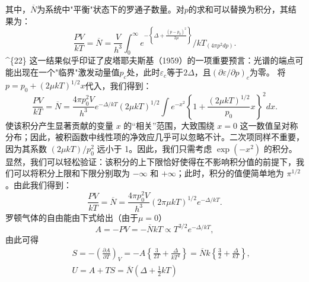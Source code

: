 其中，\(\overline{N}\)为系统中"平衡"状态下的罗通子数量。对\(p\)的求和可以替换为积分，其结果为：
\begin{equation}\tag{7.5.27}\label{eq:7.5.27}
\frac { P V } { k T } = \overline { { N } } = \frac { V } { h ^{3} } \int _ { 0 } ^{\infty} e ^{- \left\{ \Delta + \frac { ( p - p _ { 0} ) ^{2} } { 2 \mu } \right\} } \Bigg / k T _ { ( 4 \pi p ^{2} d p ) } .
\end{equation}
\^{}\{22\} 这一结果似乎印证了皮塔耶夫斯基（1959）的一项重要预言：光谱的端点可能出现在一个"临界"激发动量值\(p_{c}\)处，此时\(\varepsilon_{c}\)等于\(2\Delta\)，且\((\partial\varepsilon/\partial p)_{c}\)为零。
将\(p = p_0 + (2\mu kT)^{1/2}x\)代入，我们得到：
\begin{equation}\tag{7.5.28}\label{eq:7.5.28}
\frac { P V } { k T } = \overline { { { N } } } = \frac { 4 \pi p _ { 0 } ^{2} V } { h ^{3} } e ^{- \Delta / k T} ( 2 \mu k T ) ^{1 / 2} \int e ^{- x ^ { 2} } \left\{ 1 + \frac { ( 2 \mu k T ) ^{1 / 2} } { p _ { 0 } } x \right\} ^{2} d x .
\end{equation}
使该积分产生显著贡献的变量 \(x\) 的“相关”范围，大致围绕 \(x=0\) 这一数值呈对称分布；因此，被积函数中线性项的净效应几乎可以忽略不计。二次项同样不重要，因为其系数 \((2\mu kT)/p_{0}^{2}\) 远小于 1。因此，我们只需考虑 \(\exp(-x^{2})\) 的积分。显然，我们可以轻松验证：该积分的上下限恰好使得在不影响积分值的前提下，我们可以将积分上限和下限分别取为 \(-\infty\) 和 \(+\infty\)；此时，积分的值便简单地为 \(\pi^{1/2}\)。由此我们得到：
\begin{equation}\tag{7.5.29}\label{eq:7.5.29}
\frac { P V } { k T } = \overline { { N } } = \frac { 4 \pi p _ { 0 } ^{2} V } { h ^{3} } ( 2 \pi \mu k T ) ^{1 / 2} e ^{- \Delta / k T} .
\end{equation}
罗顿气体的自由能由下式给出（由于\(\mu = 0\)）
\begin{equation}\tag{7.5.30}\label{eq:7.5.30}
A = - P V = - \overline { { { N } } } k T \propto T ^{3 / 2} e ^{- \Delta / k T} ,
\end{equation}
由此可得
\begin{equation}\tag{7.5.31}\label{eq:7.5.31}
\begin{array}{rlr} & { } & { S = - \left( \frac { \partial A } { \partial T } \right) _ { V } = - A \left\{ \frac { 3 } { 2 T } + \frac { \Delta } { k T ^{2} } \right\} = \overline { { N } } k \left\{ \frac { 3 } { 2 } + \frac { \Delta } { k T } \right\} , } \\& { } & { U = A + T S = \overline { { N } } \left( \Delta + \frac { 1 } { 2 } k T \right) } \end{array}
\end{equation}
